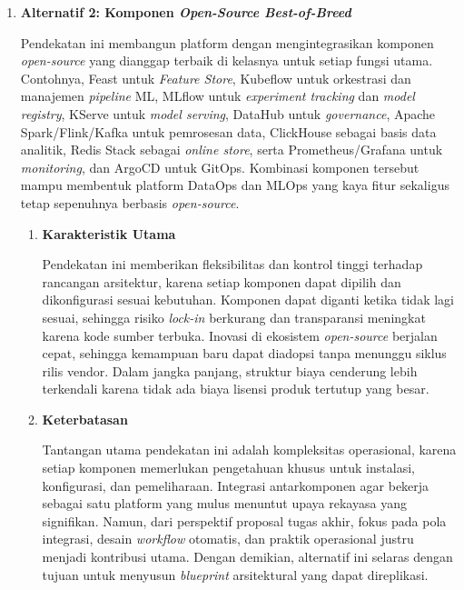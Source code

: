 \begin{enumerate}
\begin{enumerate}[label=\alph*)]
        \vspace{0.5em}    
    \end{enumerate}

    \item \textbf{Alternatif 2: Komponen \textit{Open-Source Best-of-Breed}}

    Pendekatan ini membangun platform dengan mengintegrasikan komponen \textit{open-source} yang dianggap terbaik di kelasnya untuk setiap fungsi utama. Contohnya, Feast untuk \textit{Feature Store}, Kubeflow untuk orkestrasi dan manajemen \textit{pipeline} ML, MLflow untuk \textit{experiment tracking} dan \textit{model registry}, KServe untuk \textit{model serving}, DataHub untuk \textit{governance}, Apache Spark/Flink/Kafka untuk pemrosesan data, ClickHouse sebagai basis data analitik, Redis Stack sebagai \textit{online store}, serta Prometheus/Grafana untuk \textit{monitoring}, dan ArgoCD untuk GitOps. Kombinasi komponen tersebut mampu membentuk platform DataOps dan MLOps yang kaya fitur sekaligus tetap sepenuhnya berbasis \textit{open-source}.

    \vspace{0.5em}
    \begin{enumerate}[label=\alph*)]
        \item \textbf{Karakteristik Utama}

        Pendekatan ini memberikan fleksibilitas dan kontrol tinggi terhadap rancangan arsitektur, karena setiap komponen dapat dipilih dan dikonfigurasi sesuai kebutuhan. Komponen dapat diganti ketika tidak lagi sesuai, sehingga risiko \textit{lock-in} berkurang dan transparansi meningkat karena kode sumber terbuka. Inovasi di ekosistem \textit{open-source} berjalan cepat, sehingga kemampuan baru dapat diadopsi tanpa menunggu siklus rilis vendor. Dalam jangka panjang, struktur biaya cenderung lebih terkendali karena tidak ada biaya lisensi produk tertutup yang besar.
        
        \vspace{0.5em}

        \item \textbf{Keterbatasan}

        Tantangan utama pendekatan ini adalah kompleksitas operasional, karena setiap komponen memerlukan pengetahuan khusus untuk instalasi, konfigurasi, dan pemeliharaan. Integrasi antarkomponen agar bekerja sebagai satu platform yang mulus menuntut upaya rekayasa yang signifikan. Namun, dari perspektif proposal tugas akhir, fokus pada pola integrasi, desain \textit{workflow} otomatis, dan praktik operasional justru menjadi kontribusi utama. Dengan demikian, alternatif ini selaras dengan tujuan untuk menyusun \textit{blueprint} arsitektural yang dapat direplikasi.
    

\end{enumerate}
\end{enumerate}
